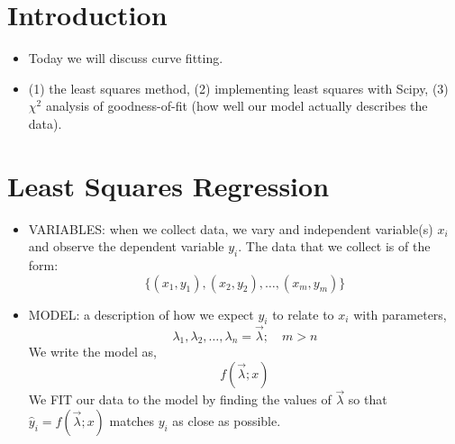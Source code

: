 \documentclass[12pt]{article}
\numberwithin{equation}{section}
\begin{document}
	
\section{Introduction}
\begin{itemize}
	\item Today we will discuss curve fitting.
	\item (1) the least squares method, (2) implementing least squares with Scipy, (3) $ \chi^2 $ analysis of goodness-of-fit (how well our model actually describes the data).
\end{itemize}

\section{Least Squares Regression}
\begin{itemize}
\item VARIABLES: when we collect data, we vary and independent variable(s) $ x_i $ and observe the dependent variable $ y_i $. The data that we collect is of the form: 
\begin{equation}
		\{(x_1, y_1),(x_2, y_2),\dots, (x_m, y_m) \}
\end{equation}
\item MODEL: a description of how we expect $ y_i $  to relate to $ x_i $ with parameters,
\begin{equation}
		\lambda_1,\lambda_2,\dots,\lambda_n = \vec{\lambda};\quad m>n
\end{equation}
We write the model as,
\begin{equation}
		f(\vec{\lambda};x)
\end{equation}
We FIT our data to the model by finding the values of $ \vec{\lambda} $ so that $ \hat{y}_i = f(\vec{\lambda};x) $ matches $ y_i $ as close as possible.


\end{itemize}
\end{document}
